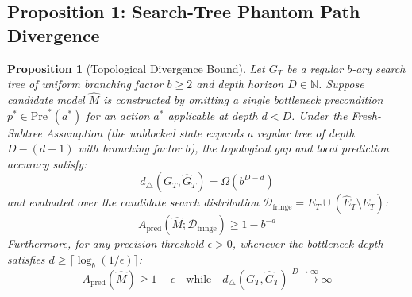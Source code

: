 \documentclass[11pt,a4paper]{article}
\newtheorem{proposition}[theorem]{Proposition}
\theoremstyle{definition}
\theoremstyle{remark}
\begin{document}
\subsection{Proposition 1: Search-Tree Phantom Path Divergence}

\begin{proposition}[Topological Divergence Bound]\label{prop:phantom_divergence}
Let $G_T$ be a regular $b$-ary search tree of uniform branching factor $b \ge 2$ and depth horizon $D \in \mathbb{N}$. Suppose candidate model $\widehat{M}$ is constructed by omitting a single bottleneck precondition $p^* \in \text{Pre}^*(a^*)$ for an action $a^*$ applicable at depth $d < D$.
Under the Fresh-Subtree Assumption (the unblocked state expands a regular tree of depth $D - (d + 1)$ with branching factor $b$), the topological gap and local prediction accuracy satisfy:
\begin{equation}
    d_\triangle(G_T, \widehat{G}_T) = \Omega\left(b^{D-d}\right)
\end{equation}
and evaluated over the candidate search distribution $\mathcal{D}_{\text{fringe}} = E_T \cup (\widehat{E}_T \setminus E_T)$:
\begin{equation}
    A_{\text{pred}}(\widehat{M}; \mathcal{D}_{\text{fringe}}) \ge 1 - b^{-d}
\end{equation}
Furthermore, for any precision threshold $\epsilon > 0$, whenever the bottleneck depth satisfies $d \ge \lceil \log_b(1/\epsilon) \rceil$:
\begin{equation}
    A_{\text{pred}}(\widehat{M}) \ge 1 - \epsilon \quad \text{while} \quad d_\triangle(G_T, \widehat{G}_T) \xrightarrow{D \to \infty} \infty
\end{equation}
\end{proposition}
\end{document}
